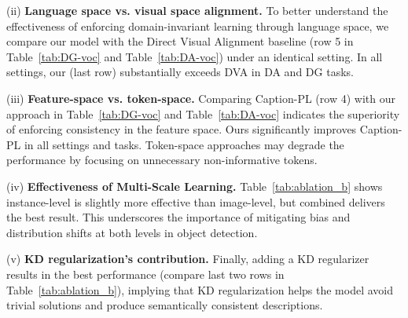 (ii) \textbf{Language space vs. visual space alignment.}
    To better understand the effectiveness of enforcing domain-invariant learning through language space, we compare our model with the Direct Visual Alignment baseline (row 5 in Table~\ref{tab:DG-voc} and Table~\ref{tab:DA-voc}) under an identical setting. In all settings, our (last row) substantially exceeds DVA in DA and DG tasks. 

(iii) \textbf{Feature-space vs. token-space.} Comparing Caption-PL (row 4) with our approach in Table~\ref{tab:DG-voc} and Table~\ref{tab:DA-voc} indicates the superiority of enforcing consistency in the feature space. Ours significantly improves Caption-PL in all settings and tasks. Token-space approaches may degrade the performance by focusing on unnecessary non-informative tokens. 

(iv) \textbf{Effectiveness of Multi-Scale Learning.} Table~\ref{tab:ablation_b} shows instance-level is slightly more effective than image-level, but combined delivers the best result. This underscores the importance of mitigating bias and distribution shifts at both levels in object detection.

(v) \textbf{KD regularization's contribution.} Finally, adding a KD regularizer results in the best performance (compare last two rows in Table~\ref{tab:ablation_b}), implying that KD regularization helps the model avoid trivial solutions and produce semantically consistent descriptions.





